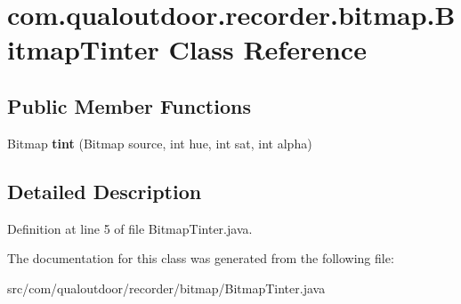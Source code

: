 \hypertarget{classcom_1_1qualoutdoor_1_1recorder_1_1bitmap_1_1BitmapTinter}{\section{com.\-qualoutdoor.\-recorder.\-bitmap.\-Bitmap\-Tinter Class Reference}
\label{classcom_1_1qualoutdoor_1_1recorder_1_1bitmap_1_1BitmapTinter}
}
\subsection*{Public Member Functions}
\begin{DoxyCompactItemize}
\item 
\hypertarget{classcom_1_1qualoutdoor_1_1recorder_1_1bitmap_1_1BitmapTinter_ab60b789cdfc3464381385ce85c0dbb78}{Bitmap {\bfseries tint} (Bitmap source, int hue, int sat, int alpha)}\label{classcom_1_1qualoutdoor_1_1recorder_1_1bitmap_1_1BitmapTinter_ab60b789cdfc3464381385ce85c0dbb78}

\end{DoxyCompactItemize}


\subsection{Detailed Description}


Definition at line 5 of file Bitmap\-Tinter.\-java.



The documentation for this class was generated from the following file\-:\begin{DoxyCompactItemize}
\item 
src/com/qualoutdoor/recorder/bitmap/Bitmap\-Tinter.\-java\end{DoxyCompactItemize}
